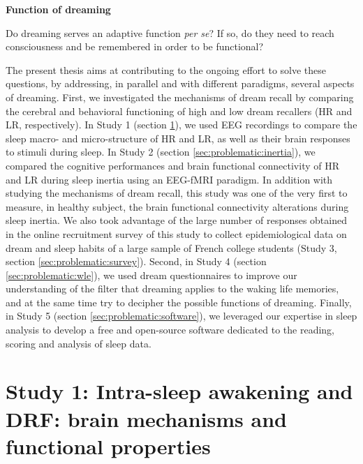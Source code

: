 \textbf{Function of dreaming}
\begin{my_list_item}
	\item Do dreaming serves an adaptive function \emph{per se}? If so, do they need to reach consciousness and be remembered in order to be functional? %
\end{my_list_item}

The present thesis aims at contributing to the ongoing effort to solve these questions, by addressing, in parallel and with different paradigms, several aspects of dreaming. First, we investigated the mechanisms of dream recall by comparing the cerebral and behavioral functioning of high and low dream recallers (HR and LR, respectively). In Study 1 (section \ref{sec:problematic:arousals}), we used EEG recordings to compare the sleep macro- and micro-structure of HR and LR, as well as their brain responses to stimuli during sleep. In Study 2 (section \ref{sec:problematic:inertia}), we compared the cognitive performances and brain functional connectivity of HR and LR during sleep inertia using an EEG-fMRI paradigm. In addition with studying the mechanisms of dream recall, this study was one of the very first to measure, in healthy subject, the brain functional connectivity alterations during sleep inertia. We also took advantage of the large number of responses obtained in the online recruitment survey of this study to collect epidemiological data on dream and sleep habits of a large sample of French college students (Study 3, section \ref{sec:problematic:survey}). Second, in Study 4 (section \ref{sec:problematic:wle}), we used dream questionnaires to improve our understanding of the filter that dreaming applies to the waking life memories, and at the same time try to decipher the possible functions of dreaming. Finally, in Study 5 (section \ref{sec:problematic:software}), we leveraged our expertise in sleep analysis to develop a free and open-source software dedicated to the reading, scoring and analysis of sleep data.

\section{Study 1: Intra-sleep awakening and DRF: brain mechanisms and functional properties}
\label{sec:problematic:arousals}

